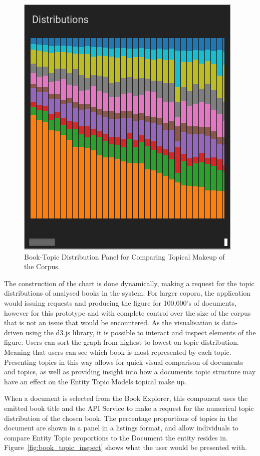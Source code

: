 \documentclass[10pt]{report}
\begin{document}
\begin{figure}[h!]
  \centering
  \includegraphics[scale=0.5]{topic_distr}
  \caption{Book-Topic Distribution Panel for Comparing Topical Makeup of the Corpus. \label{fig:book_topic_compare}}
\end{figure}

The construction of the chart is done dynamically, making a request for the topic distributions of analysed books in the system. For larger copora, the application would issuing requests and producing the figure for 100,000's of documents, however for this prototype and with complete control over the size of the corpus that is not an issue that would be encountered. As the visualisation is data-driven using the d3.js library, it is possible to interact and inspect elements of the figure. Users can sort the graph from highest to lowest on topic distribution. Meaning that users can see which book is most represented by each topic. Presenting topics in this way allows for quick visual comparison of documents and topics, as well as providing insight into how a documents topic structure may have an effect on the Entity Topic Models topical make up. 

When a document is selected from the Book Explorer, this component uses the emitted book title and the API Service to make a request for the numerical topic distribution of the chosen book. The percentage proportions of topics in the document are shown in a panel in a listings format, and allow individuals to compare Entity Topic proportions to the Document the entity resides in. Figure~\ref{fig:book_topic_inspect} shows what the user would be presented with.
\end{document}
